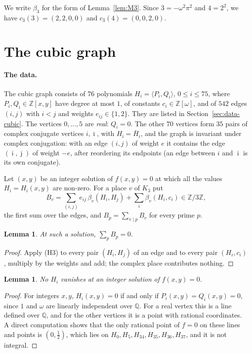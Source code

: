 \documentclass[11pt]{article}
\newtheorem{lemma}[theorem]{Lemma}
\newcommand{\Z}{\mathbb{Z}}
\newcommand{\Q}{\mathbb{Q}}
\begin{document}
We write $\beta_3$ for the form of Lemma~\ref{lem:M3}. Since $3=-\omega^2\pi^2$ and $4=2^2$, we have $c_3(3)=(2,2,0,0)$ and $c_3(4)=(0,0,2,0)$.

\section{The cubic graph}\label{sec:cubic}

\paragraph{The data.} The cubic graph consists of $76$ polynomials $H_i=\langle P_i,Q_i\rangle$, $0\leq i\leq75$, where $P_i,Q_i\in\Z[x,y]$ have degree at most $1$, of constants $c_i\in\Z[\omega]$, and of $542$ edges $(i,j)$ with $i<j$ and weights $e_{ij}\in\{1,2\}$. They are listed in Section~\ref{sec:data-cubic}. The vertices $0,\dots,5$ are \emph{real}: $Q_i=0$. The other $70$ vertices form $35$ pairs of complex conjugate vertices $i,\bar\imath$, with $H_{\bar\imath}=\bar H_i$, and the graph is invariant under complex conjugation: with an edge $(i,j)$ of weight $e$ it contains the edge $(\bar\imath,\bar\jmath)$ of weight $-e$, after reordering its endpoints (an edge between $i$ and $\bar\imath$ is its own conjugate).

Let $(x,y)$ be an integer solution of $f(x,y)=0$ at which all the values $H_i=H_i(x,y)$ are non-zero. For a place $v$ of $K_3$ put
\begin{equation}\label{eq:Bv3}
B_v=\sum_{(i,j)}e_{ij}\,\beta_v(H_i,H_j)+\sum_i\beta_v(H_i,c_i)\in\Z/3\Z,
\end{equation}
the first sum over the edges, and $B_p=\sum_{v\mid p}B_v$ for every prime $p$.

\begin{lemma}\label{lem:rec3}
At such a solution, $\sum_pB_p=0$.
\end{lemma}

\begin{proof}
Apply (H3) to every pair $(H_i,H_j)$ of an edge and to every pair $(H_i,c_i)$, multiply by the weights and add; the complex place contributes nothing.
\end{proof}

\begin{lemma}\label{lem:nonzero3}
No $H_i$ vanishes at an integer solution of $f(x,y)=0$.
\end{lemma}

\begin{proof}
For integers $x,y$, $H_i(x,y)=0$ if and only if $P_i(x,y)=Q_i(x,y)=0$, since $1$ and $\omega$ are linearly independent over $\Q$. For a real vertex this is a line defined over $\Q$, and for the other vertices it is a point with rational coordinates. A direct computation shows that the only rational point of $f=0$ on these lines and points is $(0,\tfrac12)$, which lies on $H_0,H_5,H_{34},H_{35},H_{36},H_{37}$, and it is not integral.
\end{proof}
\end{document}

